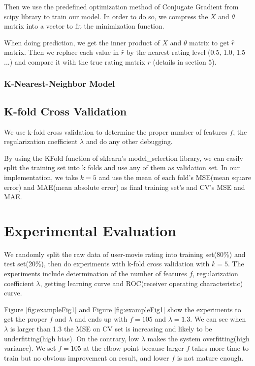 \documentclass[12pt]{article}
\begin{document}
Then we use the predefined optimization method of Conjugate Gradient from scipy library to train our model. In order to do so, we compress the $X$ and $\theta$ matrix into a vector to fit the minimization function.

When doing prediction, we get the inner product of $X$ and $\theta$ matrix to get $\hat{r}$ matrix. Then we replace each value in $\hat{r}$ by the nearest rating level (0.5, 1.0, 1.5 ...) and compare it with the true rating matrix $r$ (details in section 5).

\subsubsection{K-Nearest-Neighbor Model}

\subsection{K-fold Cross Validation}
We use k-fold cross validation to determine the proper number of features $f$, the regularization coefficient $\lambda$ and do any other debugging.

By using the KFold function of sklearn's model\_selection library, we can easily split the training set into k folds and use any of them as validation set. In our implementation, we take $k=5$ and use the mean of each fold's MSE(mean square error) and MAE(mean absolute error) as final training set's and CV's MSE and MAE.

\section{Experimental Evaluation}
We randomly split the raw data of user-movie rating into training set(80\%) and test set(20\%), then do experiments with k-fold cross validation with $k=5$.
The experiments include determination of the number of features $f$, regularization coefficient $\lambda$, getting learning curve and ROC(receiver operating characteristic) curve.

Figure \ref{fig:exampleFig1} and Figure \ref{fig:exampleFig1} show the  experiments to get the proper $f$ and $\lambda$ and ends up with $f=105$ and $\lambda = 1.3$. We can see when $\lambda$ is larger than 1.3 the MSE on CV set is increasing and likely to be underfitting(high bias). On the contrary, low $\lambda$ makes the system overfitting(high variance). We set $f=105$ at the elbow point because larger $f$ takes more time to train but no obvious improvement on result, and lower $f$ is not mature enough.
\end{document}
